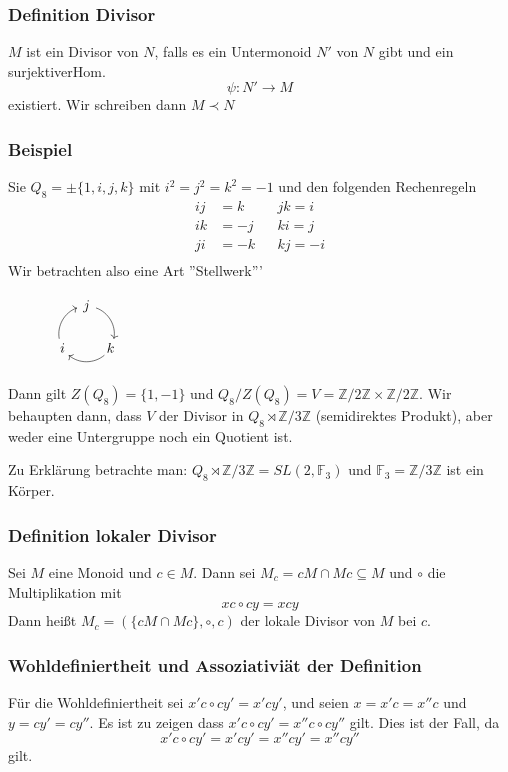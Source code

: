 \documentclass[12pt, german]{article}
\newcommand{\Z}{\mathbb{Z}}
\begin{document}
\subsubsection{Definition Divisor}
	$M$ ist ein Divisor von $N$, falls es ein Untermonoid $N'$ von $N$ gibt und ein surjektiverHom. $$\psi: N' \to M$$ existiert. Wir schreiben dann $M \prec N$

\subsubsection{Beispiel}
	Sie $Q_8 = \pm \{1, i ,j, k\}$ mit $i^2 = j^2 = k^2 = -1$ und den folgenden Rechenregeln
		\begin{align*}
			ij &= k && jk = i  \\ 
			ik&=-j 	&& ki = j \\
			 ji&= -k && kj = -i \\
		\end{align*}
Wir betrachten also eine Art ''Stellwerk'''
\begin{figure}[h!]
	\centering
	$ \begin{array}{ccc}
	\begin{tikzpicture}[->,scale=.7] 
	\foreach \a/\t in {90/j,-30/k,210/i}{
		\node (\t) at (\a:1cm) {$\t$};
		\draw (\a-20:1cm)  arc (\a-20:\a-100:1cm);
	} 
	\end{tikzpicture}
	\end{array}$
\end{figure}

Dann gilt $Z(Q_8) = \{1, -1\}$ und $Q_8/Z(Q_8) = V = \Z/2\Z \times\Z/2\Z$.
Wir behaupten dann, dass $V$ der Divisor in $Q_8  \rtimes \Z / 3\Z$ (semidirektes Produkt), aber weder eine Untergruppe noch ein Quotient ist.

Zu Erklärung betrachte man: $Q_8  \rtimes \Z / 3\Z = SL(2, \mathbb{F}_3)$ und $\mathbb{F}_3 = \Z / 3\Z$ ist ein Körper.

\subsubsection{Definition lokaler Divisor}
		Sei $M$ eine Monoid und $c \in M$. Dann sei $M_c = cM \cap Mc \subseteq M$ und $\circ$ die Multiplikation mit $$xc \circ cy = xcy$$
		Dann heißt $M_c = (\{cM \cap Mc\}, \circ, c)$ der lokale Divisor von $M$ bei $c$.

\subsubsection{Wohldefiniertheit und Assoziativiät der Definition}
	Für die Wohldefiniertheit sei $x'c \circ cy' = x'cy'$, und seien $x = x'c = x''c$ und $y = cy' = cy''$. Es ist zu zeigen dass $x'c \circ cy' = x''c \circ cy''$ gilt. Dies ist der Fall, da $$x'c \circ cy' = x'cy' = x''cy' = x''cy''$$ gilt. 
	
\end{document}
